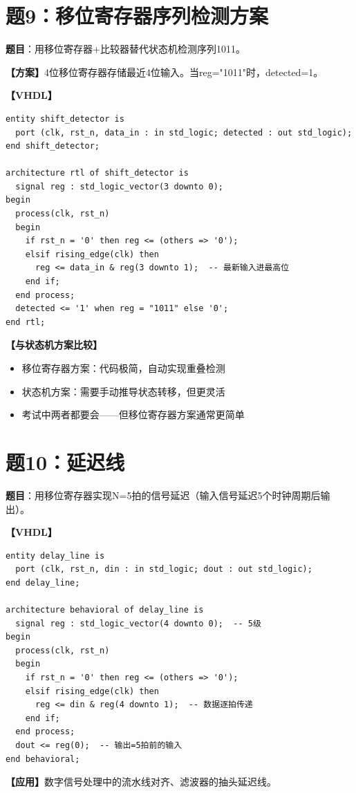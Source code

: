 \section{题9：移位寄存器序列检测方案}

\textbf{题目}：用移位寄存器+比较器替代状态机检测序列1011。

\begin{solution}[完整解答]

\textbf{【方案】}4位移位寄存器存储最近4位输入。当reg="1011"时，detected=1。

\textbf{【VHDL】}
\begin{lstlisting}
entity shift_detector is
  port (clk, rst_n, data_in : in std_logic; detected : out std_logic);
end shift_detector;

architecture rtl of shift_detector is
  signal reg : std_logic_vector(3 downto 0);
begin
  process(clk, rst_n)
  begin
    if rst_n = '0' then reg <= (others => '0');
    elsif rising_edge(clk) then
      reg <= data_in & reg(3 downto 1);  -- 最新输入进最高位
    end if;
  end process;
  detected <= '1' when reg = "1011" else '0';
end rtl;
\end{lstlisting}

\textbf{【与状态机方案比较】}
\begin{itemize}
  \item 移位寄存器方案：代码极简，自动实现重叠检测
  \item 状态机方案：需要手动推导状态转移，但更灵活
  \item 考试中两者都要会——但移位寄存器方案通常更简单
\end{itemize}

\end{solution}


\section{题10：延迟线}

\textbf{题目}：用移位寄存器实现N=5拍的信号延迟（输入信号延迟5个时钟周期后输出）。

\begin{solution}[完整解答]

\textbf{【VHDL】}
\begin{lstlisting}
entity delay_line is
  port (clk, rst_n, din : in std_logic; dout : out std_logic);
end delay_line;

architecture behavioral of delay_line is
  signal reg : std_logic_vector(4 downto 0);  -- 5级
begin
  process(clk, rst_n)
  begin
    if rst_n = '0' then reg <= (others => '0');
    elsif rising_edge(clk) then
      reg <= din & reg(4 downto 1);  -- 数据逐拍传递
    end if;
  end process;
  dout <= reg(0);  -- 输出=5拍前的输入
end behavioral;
\end{lstlisting}

\textbf{【应用】}数字信号处理中的流水线对齐、滤波器的抽头延迟线。

\end{solution}


